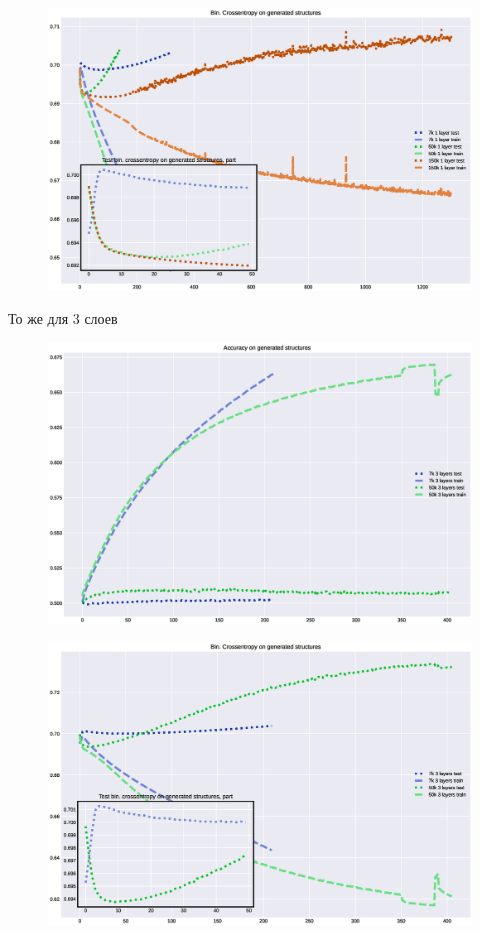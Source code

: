 \documentclass{article}
\begin{document}
\begin{figure}[h!tp]
\centering
\includegraphics[scale=.500]{imgs/loss-1l_ndata.eps}
\caption{}
\label{}
\end{figure}

То же для 3 слоев
\begin{figure}[h!tp]
\centering
\includegraphics[scale=.500]{imgs/acc-3l_ndata.eps}
\caption{}
\label{}
\end{figure}


\begin{figure}[h!tp]
\centering
\includegraphics[scale=.500]{imgs/loss-3l_ndata.eps}
\caption{}
\label{}
\end{figure}
\end{document}
